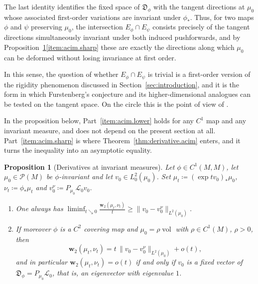 \documentclass[11pt,reqno]{amsart}
\theoremstyle{plain}
\newtheorem{prp}[thm]{Proposition}
\theoremstyle{definition}
\newcommand{\dw}{\mathbf{w}_2}
\newcommand{\D}{\mathfrak{D}}
\newcommand{\Prob}{\mathcal{P}}
\newcommand{\Transf}{\mathcal{L}}
\DeclareMathOperator{\vol}{vol}
\begin{document}
The last identity identifies the fixed space of \( \D_\phi \) with the tangent directions at \( \mu_0 \) whose associated first-order variations are invariant under \( \phi_\ast \).
Thus, for two maps \( \phi \) and \( \psi \) preserving \( \mu_0 \), the intersection \( E_\phi\cap E_\psi \) consists precisely of the tangent directions simultaneously invariant under both induced pushforwards, and by Proposition~\ref{prp:acim.derivative}\ref{item:acim.sharp} these are exactly the directions along which \( \mu_0 \) can be deformed without losing invariance at first order.

In this sense, the question of whether \( E_\phi\cap E_\psi \) is trivial is a first-order version of the rigidity phenomenon discussed in Section~\ref{sec:introduction}, and it is the form in which Furstenberg's conjecture \cite{furstenberg_disjointness_1967} and its higher-dimensional analogues can be tested on the tangent space.
On the circle this is the point of view of \cite[\S1.4]{kloeckner_optimal_2013_preprint}.

In the proposition below, Part~\ref{item:acim.lower} holds for any \( C^1 \) map and any invariant measure, and does not depend on the present section at all. Part~\ref{item:acim.sharp} is where Theorem~\ref{thm:derivative.acim} enters, and it turns the inequality into an asymptotic equality.

\begin{prp}[Derivatives at invariant measures]
\label{prp:acim.derivative}
    Let \( \phi\in C^1(M,M) \), let \( \mu_0\in\Prob(M) \) be \( \phi \)-invariant and let \( v_0\in L^2_0(\mu_0) \).
    Set \( \mu_t\coloneqq(\exp tv_0)_\ast\mu_0 \), \( \nu_t\coloneqq\phi_\ast\mu_t \) and \( v_0^\nu\coloneqq P_{\mu_0}\Transf_0v_0 \).
    \begin{enumerate}
        \item\label{item:acim.lower}
            One always has
            \( \displaystyle\liminf_{t\searrow0}\frac{\dw(\mu_t,\nu_t)}{t}\ge\lVert v_0-v_0^\nu\rVert_{L^2(\mu_0)} \).
        \item\label{item:acim.sharp}
            If moreover \( \phi \) is a \( C^2 \) covering map and \( \mu_0=\rho\vol \) with \( \rho\in C^1(M) \), \( \rho>0 \), then
            \[
                \dw(\mu_t,\nu_t)=t\,\lVert v_0-v_0^\nu\rVert_{L^2(\mu_0)}+o(t) ,
            \]
            and in particular \( \dw(\mu_t,\nu_t)=o(t) \) if and only if \( v_0 \) is a fixed vector of \( \D_\phi=P_{\mu_0}\Transf_0 \), that is, an eigenvector with eigenvalue \( 1 \).
    \end{enumerate}
\end{prp}
\end{document}
